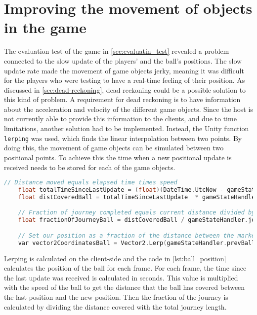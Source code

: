 \section{Improving the movement of objects in the game}\label{sec:lerping}
The evaluation test of the game in \autoref{sec:evaluatin_test} revealed a problem connected to the slow update of the players' and the ball's positions.
The slow update rate made the movement of game objects jerky, meaning it was difficult for the players who were testing to have a real-time feeling of their position.
As discussed in \autoref{sec:dead-reckoning}, dead reckoning could be a possible solution to this kind of problem.
A requirement for dead reckoning is to have information about the acceleration and velocity of the different game objects.
Since the host is not currently able to provide this information to the clients, and due to time limitations, another solution had to be implemented.
Instead, the Unity function \texttt{lerping} was used, which finds the linear interpolation between two points.
By doing this, the movement of game objects can be simulated between two positional points.
To achieve this the time when a new positional update is received needs to be stored for each of the game objects.
\begin{lstlisting}[caption={Calculating the position of the ball}, captionpos=b,language=C,label={lst:ball_position}]
    // Distance moved equals elapsed time times speed
    float totalTimeSinceLastUpdate = (float)(DateTime.UtcNow - gameStateHandler.timeAtLastUpdateBall).TotalSeconds;
    float distCoveredBall = totalTimeSinceLastUpdate  * gameStateHandler.ballSpeed;

    // Fraction of journey completed equals current distance divided by total distance.
    float fractionOfJourneyBall = distCoveredBall / gameStateHandler.journeyLengthBall;

    // Set our position as a fraction of the distance between the markers.
    var vector2CoordinatesBall = Vector2.Lerp(gameStateHandler.prevBallPosition, gameStateHandler.newBallPosition, fractionOfJourneyBall);
\end{lstlisting}
Lerping is calculated on the client-side and the code in \autoref{lst:ball_position} calculates the position of the ball for each frame.
For each frame, the time since the last update was received is calculated in seconds.
This value is multiplied with the speed of the ball to get the distance that the ball has covered between the last position and the new position.
Then the fraction of the journey is calculated by dividing the distance covered with the total journey length.

